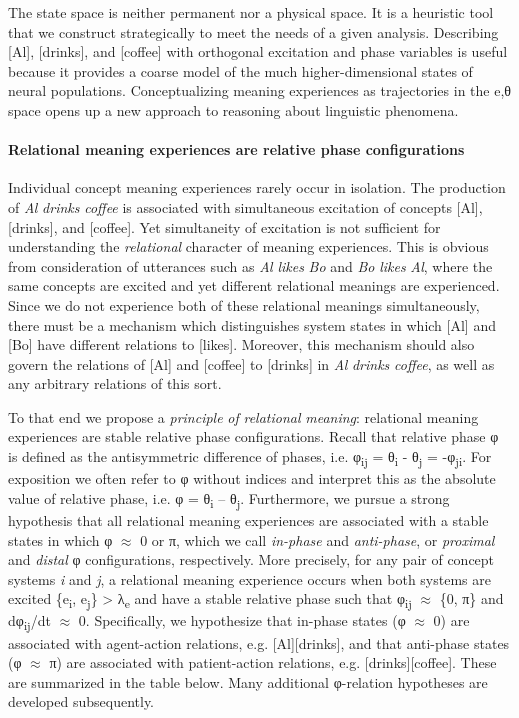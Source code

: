   The state space is neither permanent nor a physical space. It is a heuristic tool that we construct strategically to meet the needs of a given analysis. Describing [Al], [drinks], and [coffee] with orthogonal excitation and phase variables is useful because it provides a coarse model of the much higher-dimensional states of neural populations. Conceptualizing meaning experiences as trajectories in the e,θ space opens up a new approach to reasoning about linguistic phenomena.

\paragraph{Relational meaning experiences are relative phase configurations}

Individual concept meaning experiences rarely occur in isolation. The production of \textit{Al} \textit{drinks} \textit{coffee} is associated with simultaneous excitation of concepts [Al], [drinks], and [coffee]. Yet simultaneity of excitation is not sufficient for understanding the \textit{relational} character of meaning experiences. This is obvious from consideration of utterances such as \textit{Al} \textit{likes} \textit{Bo} and \textit{Bo} \textit{likes} \textit{Al}, where the same concepts are excited and yet different relational meanings are experienced. Since we do not experience both of these relational meanings simultaneously, there must be a mechanism which distinguishes system states in which [Al] and [Bo] have different relations to [likes]. Moreover, this mechanism should also govern the relations of [Al] and [coffee] to [drinks] in \textit{Al} \textit{drinks} \textit{coffee}, as well as any arbitrary relations of this sort. 

  To that end we propose a \textit{principle} \textit{of} \textit{relational} \textit{meaning}: relational meaning experiences are stable relative phase configurations. Recall that relative phase φ is defined as the antisymmetric difference of phases, i.e. φ\textsubscript{ij} = θ\textsubscript{i} - θ\textsubscript{j} = -φ\textsubscript{ji}. For exposition we often refer to φ without indices and interpret this as the absolute value of relative phase, i.e. {\textbar}φ{\textbar} = {\textbar}θ\textsubscript{i} – θ\textsubscript{j}{\textbar}. Furthermore, we pursue a strong hypothesis that all relational meaning experiences are associated with a stable states in which φ ${\approx}$ 0 or π, which we call \textit{in-phase} and \textit{anti-phase}, or \textit{proximal} and \textit{distal} φ configurations, respectively. More precisely, for any pair of concept systems \textit{i} and \textit{j}, a relational meaning experience occurs when both systems are excited \{e\textsubscript{i}, e\textsubscript{j}\} > λ\textsubscript{e} and have a stable relative phase such that {\textbar}φ\textsubscript{ij}{\textbar} ${\approx}$ \{0, π\} and dφ\textsubscript{ij}/dt ${\approx}$ 0. Specifically, we hypothesize that in-phase states (φ ${\approx}$ 0) are associated with agent-action relations, e.g. [Al][drinks], and that anti-phase states (φ ${\approx}$ π) are associated with patient-action relations, e.g. [drinks][coffee]. These are summarized in the table below. Many additional φ-relation hypotheses are developed subsequently.

